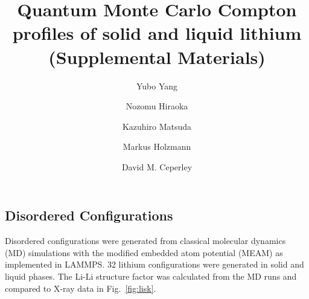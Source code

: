 \documentclass[aps,prl,superscriptaddress]{revtex4-1}
\begin{document}
\title{Quantum Monte Carlo Compton profiles of solid and liquid lithium (Supplemental Materials)}
\author{Yubo Yang}
\author{Nozomu Hiraoka}
\author{Kazuhiro Matsuda}
\author{Markus Holzmann}
\author{David M. Ceperley}
\maketitle

\subsection{Disordered Configurations}

Disordered configurations were generated from classical molecular dynamics (MD) simulations with the modified embedded atom potential (MEAM) as implemented in LAMMPS. 32 lithium configurations were generated in solid and liquid phases. The Li-Li structure factor was calculated from the MD runs and compared to X-ray data in Fig.~\ref{fig:lisk}.
\end{document}
